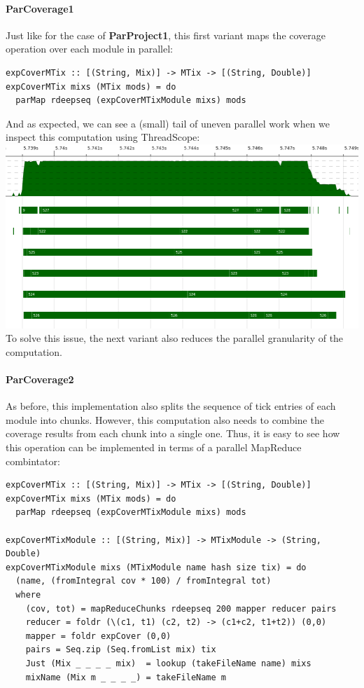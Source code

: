 \documentclass[a4paper,10pt]{article}
\begin{document}
\paragraph{ParCoverage1}
Just like for the case of \textbf{ParProject1}, this first variant maps the
coverage operation over each module in parallel:

\begin{verbatim}
expCoverMTix :: [(String, Mix)] -> MTix -> [(String, Double)]
expCoverMTix mixs (MTix mods) = do
  parMap rdeepseq (expCoverMTixModule mixs) mods
\end{verbatim}

And as expected, we can see a (small) tail of uneven parallel work when we
inspect this computation using ThreadScope:\\

\includegraphics[scale=0.3]{threadscope/ParCoverage1}\\

To solve this issue, the next variant also reduces the parallel granularity of
the computation.

\paragraph{ParCoverage2}

As before, this implementation also splits the sequence of tick entries of each
module into chunks.
%
However, this computation also needs to combine the coverage results from each
chunk into a single one.
%
Thus, it is easy to see how this operation can be implemented in terms of a
parallel MapReduce combintator:

\begin{verbatim}
expCoverMTix :: [(String, Mix)] -> MTix -> [(String, Double)]
expCoverMTix mixs (MTix mods) = do
  parMap rdeepseq (expCoverMTixModule mixs) mods

expCoverMTixModule :: [(String, Mix)] -> MTixModule -> (String, Double)
expCoverMTixModule mixs (MTixModule name hash size tix) = do
  (name, (fromIntegral cov * 100) / fromIntegral tot)
  where
    (cov, tot) = mapReduceChunks rdeepseq 200 mapper reducer pairs
    reducer = foldr (\(c1, t1) (c2, t2) -> (c1+c2, t1+t2)) (0,0)
    mapper = foldr expCover (0,0)
    pairs = Seq.zip (Seq.fromList mix) tix
    Just (Mix _ _ _ _ mix)  = lookup (takeFileName name) mixs
    mixName (Mix m _ _ _ _) = takeFileName m
\end{verbatim}
\end{document}
